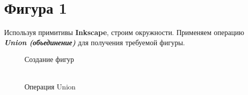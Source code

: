 \section[Фигура 1]{Фигура 1}
Используя примитивы \textbf{Inkscape}, строим окружности. 
Применяем операцию \textit{\textbf{Union (объединение)}} для получения требуемой фигуры.

\hspace{0pt}
\begin{figure}[H]
    \begin{minipage}[h]{0.47\linewidth}
         Создание фигур\\
    \end{minipage}
    \hfill
    \begin{minipage}[h]{0.47\linewidth}
         \\Операция Union
    \end{minipage}
    \hfill
\end{figure}
